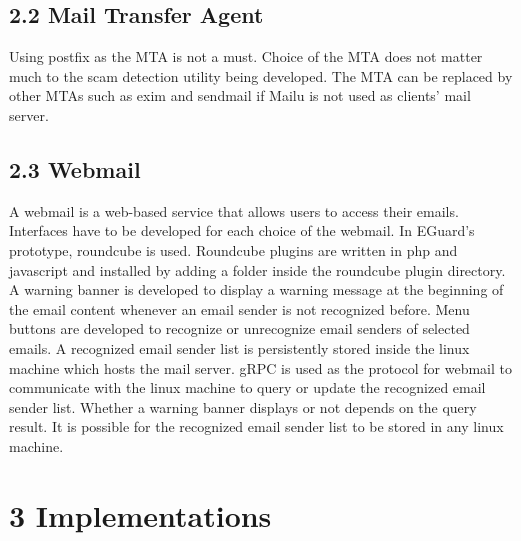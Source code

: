 \documentclass[11pt]{article}
\begin{document}
\subsection*{2.2 \hspace{10pt} Mail Transfer Agent}
Using postfix as the MTA is not a must. Choice of the MTA does not matter much to the scam detection utility being developed. The MTA can be replaced by other MTAs such as exim and sendmail if Mailu is not used as clients' mail server. 

\subsection*{2.3 \hspace{10pt} Webmail}
A webmail is a web-based service that allows users to access their emails. Interfaces have to be developed for each choice of the webmail. In EGuard's prototype, roundcube is used. Roundcube plugins are written in php and javascript and installed by adding a folder inside the roundcube plugin directory. A warning banner is developed to display a warning message at the beginning of the email content whenever an email sender is not recognized before. Menu buttons are developed to recognize or unrecognize email senders of selected emails. A recognized email sender list is persistently stored inside the linux machine which hosts the mail server. gRPC is used as the protocol for webmail to communicate with the linux machine to query or update the recognized email sender list. Whether a warning banner displays or not depends on the query result. It is possible for the recognized email sender list to be stored in any linux machine.

\section*{\large{3 \hspace{10pt} Implementations}}
\end{document}
